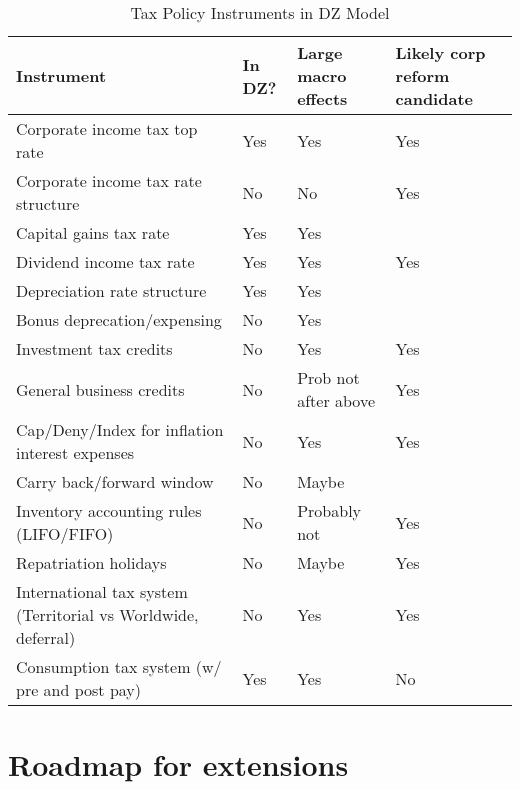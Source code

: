 \begin{table}[htbp]
  \centering
  \caption{Tax Policy Instruments in DZ Model}
    \begin{tabular}{llll}
    \hline
    \hline
    Instrument & In DZ? & Large macro effects & Likely corp reform candidate \\
    \hline
    Corporate income tax top rate & Yes   &   Yes   & Yes \\
    Corporate income tax rate structure & No     & No    & Yes \\
    Capital gains tax rate & Yes   & Yes   &  \\
    Dividend income tax rate & Yes   & Yes   & Yes \\
    Depreciation rate structure & Yes   &   Yes   &  \\
    Bonus deprecation/expensing & No    & Yes   &  \\
    Investment tax credits & No   & Yes   & Yes \\
    General business credits & No  & Prob not after above & Yes \\
    Cap/Deny/Index for inflation interest expenses & No        & Yes   & Yes \\
    Carry back/forward window & No    &  Maybe &  \\
    Inventory accounting rules (LIFO/FIFO) & No   & Probably not & Yes \\
    Repatriation holidays & No   & Maybe & Yes \\
    International tax system (Territorial vs Worldwide, deferral) & No   & Yes   & Yes \\
    Consumption tax system (w/ pre and post pay)  & Yes & Yes & No \\
    \hline
    \hline
    \end{tabular}%
  \label{tab:tax_instruments}%
\end{table}%


\section{Roadmap for extensions}

